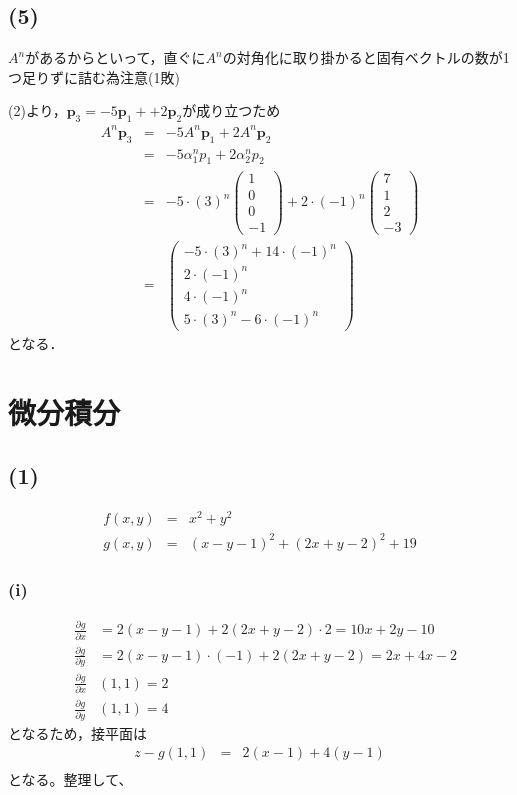 \documentclass[11pt, titlepage]{jsarticle}
\begin{document}
\newpage
\subsection*{(5)}
$A^n$があるからといって，直ぐに$A^n$の対角化に取り掛かると固有ベクトルの数が1つ足りずに詰む為注意(1敗)

(2)より，$\boldsymbol p_3=-5 \boldsymbol p_1 + +2 \boldsymbol p_2$が成り立つため
\begin{eqnarray*}
  A^n \boldsymbol p_3 &=& -5 A^n \boldsymbol p_1 + 2 A^n \boldsymbol p_2 \\
  &=& -5\alpha_1^n p_1 + 2\alpha_2^n p_2 \\
  &=& -5\cdot(3)^n \begin{pmatrix}
    1 \\
    0 \\
    0 \\
    -1
  \end{pmatrix} + 2\cdot(-1)^n \begin{pmatrix}
    7 \\
    1 \\
    2 \\
    -3
  \end{pmatrix}\\
  &=&\begin{pmatrix}
    -5\cdot(3)^n  + 14\cdot(-1)^n \\
    2\cdot(-1)^n                  \\
    4\cdot(-1)^n                  \\
    5\cdot(3)^n  -6\cdot(-1)^n
  \end{pmatrix}
\end{eqnarray*}
となる．

\newpage
\section{微分積分}
\subsection*{(1)}
\begin{eqnarray*}
  f(x,y)&=&x^2+y^2\\
  g(x,y)&=&(x-y-1)^2+(2x+y-2)^2+19
\end{eqnarray*}
\subsubsection*{(i)}
\begin{eqnarray*}
  &\frac{\partial g}{\partial x}&=2(x-y-1)+2(2x+y-2)\cdot 2=10x+2y-10\\
  &\frac{\partial g}{\partial y}&=2(x-y-1)\cdot(-1)+2(2x+y-2)=2x+4x-2\\
  &\frac{\partial g}{\partial x}&(1,1)=2\\
  &\frac{\partial g}{\partial y}&(1,1)=4
\end{eqnarray*}
となるため，接平面は
\begin{eqnarray*}
  z-g(1,1)&=&2(x-1)+4(y-1) \\
\end{eqnarray*}
となる。整理して、
\end{document}
